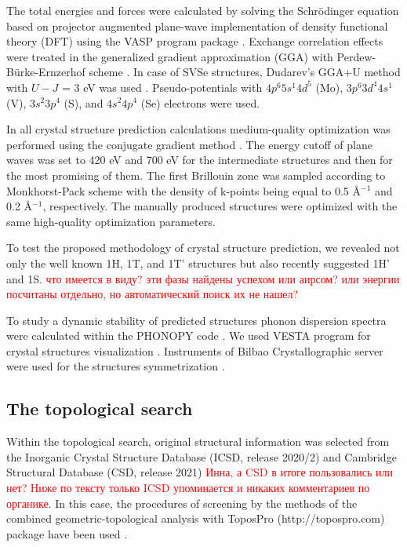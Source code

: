 \documentclass[a4paperm]{article}
\begin{document}
The total energies and forces were calculated by solving the Schr\"{o}dinger equation based on projector augmented plane-wave implementation \cite{blochl1994projector} of density functional theory (DFT) using the VASP program package \cite{vasp1,vasp2}.
Exchange correlation effects were treated in the generalized gradient approximation (GGA) with Perdew-B\"{u}rke-Ernzerhof scheme \cite{pbe}.
In case of SVSe structures, Dudarev’s GGA+U method \cite{gga+u} with $U-J$ = 3 eV was used \cite{PhysRevB.93.054429,C6CP06732H}.
Pseudo-potentials with $4p^6 5s^1 4d^5$ (Mo), $3p^6 3d^4 4s^1$ (V), $3s^2 3p^4$ (S), and $4s^2 4p^4$ (Se) electrons were used.

In all crystal structure prediction calculations medium-quality optimization was performed using the conjugate gradient method \cite{conjugate_gradient}. 
The energy cutoff of plane waves was set to 420 eV and 700 eV for the intermediate structures and then for the most promising of them. 
The first Brillouin zone was sampled according to Monkhorst-Pack scheme \cite{monkhorst1976special} with the density of k-points being equal to 0.5 \AA$^{-1}$ and 0.2 \AA$^{-1}$, respectively. 
The manually produced structures were optimized with the same high-quality optimization parameters.

To test the proposed methodology of crystal structure prediction, we revealed not only the well known 1H, 1T, and 1T' structures but also recently suggested 1H' and 1S. \textcolor{red}{что имеется в виду? эти фазы найдены успехом или аирсом? или энергии посчитаны отдельно, но автоматический поиск их не нашел?}

To study a dynamic stability of predicted structures phonon dispersion spectra were calculated within the PHONOPY code \cite{phonopy}. 
We used VESTA program for crystal structures visualization \cite{momma2011vesta}.
Instruments of Bilbao Crystallographic server were used for the structures symmetrization \cite{bilbao}.



\subsection*{The topological search}

Within the topological search, original structural information was selected from the Inorganic Crystal Structure Database (ICSD, release 2020/2) \cite{icsd_1} and Cambridge Structural Database (CSD, release 2021) \cite{icsd_2} 
\textcolor{red}{Инна, а CSD в итоге пользовались или нет? Ниже по тексту только ICSD упоминается и никаких комментариев по органике}.
In this case, the procedures of screening  by the methods of the combined geometric-topological analysis with ToposPro (http://topospro.com) package have been used \cite{topos_1}. 
\end{document}
